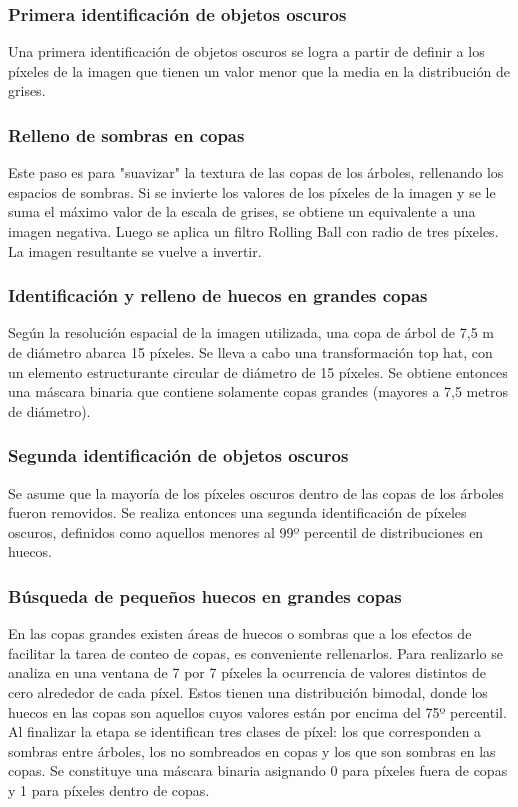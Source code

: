 \subsubsection{Primera identificación de objetos oscuros}
Una primera identificación de objetos oscuros se logra a partir de definir a los píxeles de la imagen que tienen un valor menor que la media en la distribución de grises.
\subsubsection{Relleno de sombras en copas}
Este paso es para "suavizar" la textura de las copas de los árboles, rellenando los espacios de sombras.
Si se invierte los valores de los píxeles de la imagen y se le suma el máximo valor de la escala de grises, se obtiene un equivalente a una imagen negativa. Luego se aplica un filtro Rolling Ball con radio de tres píxeles. La imagen resultante se vuelve a invertir.
\subsubsection{Identificación y relleno de huecos en grandes copas}
Según la resolución espacial de la imagen utilizada, una copa de árbol de 7,5 m de diámetro abarca 15 píxeles. Se lleva a cabo una transformación top hat, con un elemento estructurante circular de diámetro de 15 píxeles. Se obtiene entonces una máscara binaria que contiene solamente copas grandes (mayores a 7,5 metros de diámetro).
\subsubsection{ Segunda identificación de objetos oscuros}
Se asume que la mayoría de los píxeles oscuros dentro de las copas de los árboles fueron removidos. Se realiza entonces una segunda identificación de píxeles oscuros, definidos como aquellos menores al 99º percentil de distribuciones en huecos.
\subsubsection{Búsqueda de pequeños huecos en grandes copas}
En las copas grandes existen áreas de huecos o sombras que a los efectos de facilitar la tarea de conteo de copas, es conveniente rellenarlos. Para realizarlo se analiza en una ventana de 7 por 7 píxeles la ocurrencia de valores distintos de cero alrededor de cada píxel. Estos tienen una distribución bimodal, donde los huecos en las copas son aquellos cuyos valores están por encima del 75º percentil. Al finalizar la etapa se identifican tres clases de píxel: los que corresponden a sombras entre árboles, los no sombreados en copas y los que son sombras en las copas. Se constituye una máscara binaria asignando 0 para píxeles fuera de copas y 1 para píxeles dentro de copas.
